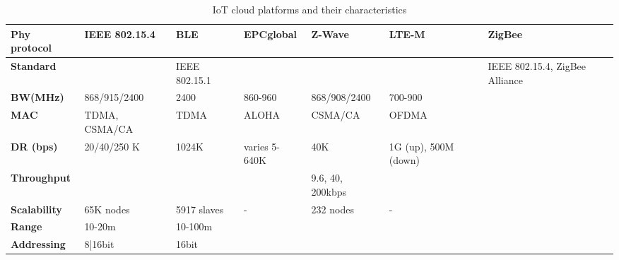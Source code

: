 \begin{table}[h!]
\scriptsize
	\begin{tabulary}{\columnwidth}{L|L|L|L|L|L|L}
	\bf{Phy protocol}     & \bf{IEEE 802.15.4} & \bf{BLE}      & \bf{EPCglobal} & \bf{Z-Wave}              & \bf{LTE-M}           & \bf{ZigBee} \\\hline
	\bf{Standard}    &                    & IEEE 802.15.1 &                &                          &                      & IEEE 802.15.4, ZigBee Alliance \\\hline
	\bf{\ac{BW}(MHz)} & 868/915/2400       & 2400          & 860-960        & 868/908/2400             & 700-900              & \\\hline
	\bf{MAC}      & TDMA, CSMA/CA      & TDMA          & ALOHA          & CSMA/CA                  & OFDMA                & \\\hline
	\bf{\ac{DR} (bps)}  & 20/40/250 K        & 1024K         & varies 5-640K  & 40K                      & 1G (up), 500M (down) & \\\hline
	\bf{Throughput}       &                    &               &                & 9.6, 40, 200kbps         &                      & \\\hline
	\bf{Scalability}  & 65K nodes          & 5917 slaves   & -              & 232 nodes                & -                    & \\\hline
	\bf{Range}            & 10-20m             & 10-100m       &                &                          &                      & \\\hline
	\bf{Addressing}       & 8|16bit            & 16bit         &                &                          &                      & \\\hline
	\end{tabulary}
	\caption{\label{tab:IoT_cloud} IoT cloud platforms and their characteristics \cite{al-fuqaha_internet_24}}
\end{table}


